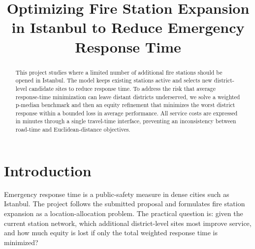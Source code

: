 \documentclass[conference]{IEEEtran}
\begin{document}
\title{Optimizing Fire Station Expansion in Istanbul to Reduce Emergency Response Time}

\author{
\and
{}
\and
{}
}

\maketitle

\begin{abstract}
This project studies where a limited number of additional fire stations should be opened in Istanbul. The model keeps existing stations active and selects new district-level candidate sites to reduce response time. To address the risk that average response-time minimization can leave distant districts underserved, we solve a weighted p-median benchmark and then an equity refinement that minimizes the worst district response within a bounded loss in average performance. All service costs are expressed in minutes through a single travel-time interface, preventing an inconsistency between road-time and Euclidean-distance objectives.
\end{abstract}

\section{Introduction}
Emergency response time is a public-safety measure in dense cities such as Istanbul. The project follows the submitted proposal and formulates fire station expansion as a location-allocation problem. The practical question is: given the current station network, which additional district-level sites most improve service, and how much equity is lost if only the total weighted response time is minimized?
\end{document}
